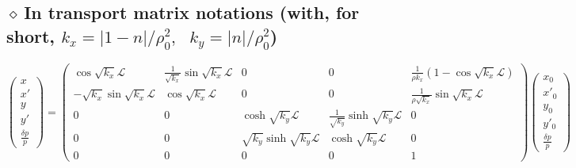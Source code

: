 \documentclass[12pt]{article}
\newcommand{\nid}{\noindent \ensuremath{\diamond~}}
\begin{document}
{\fontsize{16}{20} \selectfont

\subsection*{\LARGE  \nid In transport matrix notations  (with, for short, 
$k_x = |1-n| /\rho_0^2, ~ ~ ~ k_y = |n| /\rho_0^2$)}


{%
$$\left(
\begin{array}{ccccc} x \\ x' \\ y \\ y' \\ \frac{\textstyle{\delta p}}{\textstyle{p}} 
\end{array} 
\right)
\! = \!
\left(
\begin{array}{ccccc} 
 \cos \sqrt{k_x} \mathcal{L} & \frac{\textstyle{1}}{\textstyle{\sqrt{k_x}}}  \sin \sqrt{k_x}  \mathcal{L}  
 & 0& 0 & \frac{\textstyle{1}}{\textstyle{\rho k_x}}(1 - \cos \sqrt{k_x} \mathcal{L} ) \\[-.4000ex]
 - \sqrt{k_x} \sin \sqrt{k_x}  \mathcal{L} 
&   \cos \sqrt{k_x}  \mathcal{L} 
 & 0 & 0 & \frac{\textstyle{1}}{\textstyle{\rho \sqrt{k_x}}}\sin \sqrt{k_x} \mathcal{L} \\[-.4000ex]
0 & 0 &  \cosh \sqrt{k_y} \mathcal{L} & \frac{\textstyle{1}}{\textstyle{ \sqrt{k_y}}}  \sinh \sqrt{k_y}  \mathcal{L} & 0 \\ [-.4000ex]
0 & 0 &  \sqrt{k_y} \sinh \sqrt{k_y}  \mathcal{L} &  \cosh \sqrt{k_y}  \mathcal{L} & 0  \\[-.4000ex]
0 & 0 & 0 & 0 & 1 
\end{array} \right)
\left(
\begin{array}{ccccc} x_0 \\ x'_0 \\ y_0  \\ y'_0  \\  \frac{\textstyle{\delta p}}{\textstyle{p}} 
\end{array} 
\right)$$
}

}
\end{document}
